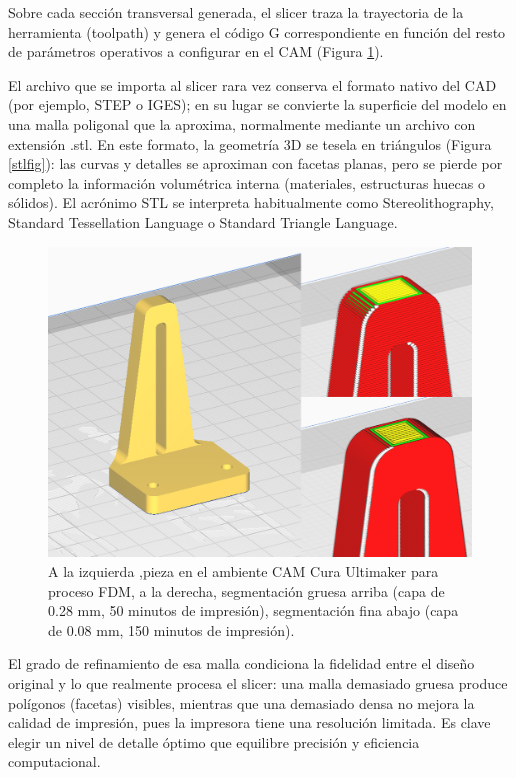 Sobre cada sección transversal generada, el slicer traza la trayectoria de la herramienta (toolpath) y genera el código G correspondiente en función del resto de parámetros operativos a configurar en el CAM (Figura \ref{slicerfig}).

El archivo que se importa al slicer rara vez conserva el formato nativo del CAD (por ejemplo, STEP o IGES); en su lugar se convierte la superficie del modelo en una malla poligonal que la aproxima, normalmente mediante un archivo con extensión .stl. En este formato, la geometría 3D se tesela en triángulos (Figura \ref{stlfig}): las curvas y detalles se aproximan con facetas planas, pero se pierde por completo la información volumétrica interna (materiales, estructuras huecas o sólidos). El acrónimo STL se interpreta habitualmente como Stereolithography, Standard Tessellation Language o Standard Triangle Language.

\begin{figure}[h!]
	\centering
	\includegraphics[width=0.8\linewidth]{imgs/slicer.png}
	\caption{A la izquierda ,pieza en el ambiente CAM Cura Ultimaker para proceso FDM, a la derecha, segmentación gruesa arriba (capa de 0.28 mm, 50 minutos de impresión), segmentación fina abajo (capa de 0.08 mm, 150 minutos de impresión).}
	\label{slicerfig}
\end{figure} 

El grado de refinamiento de esa malla condiciona la fidelidad entre el diseño original y lo que realmente procesa el slicer: una malla demasiado gruesa produce polígonos (facetas) visibles, mientras que una demasiado densa no mejora la calidad de impresión, pues la impresora tiene una resolución limitada. Es clave elegir un nivel de detalle óptimo que equilibre precisión y eficiencia computacional.

